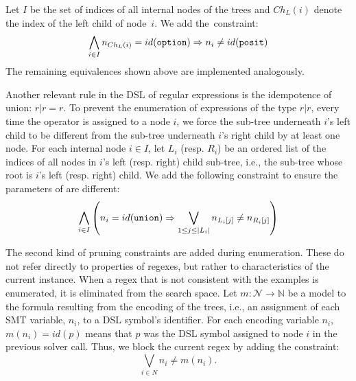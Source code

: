 Let \(I\) be the set of indices of all internal nodes of the trees and \(Ch_L(i)\) denote the index of the left child of node~\(i\). We add the~constraint:
\begin{equation}
     \bigwedge_{i \in I} n_{Ch_L(i)} = id(\texttt{option}{}) \Rightarrow n_i \ne id(\texttt{posit}{})
\end{equation}
The remaining equivalences shown above are implemented analogously.

Another relevant rule in the DSL of regular expressions is the idempotence of union: \(r|r = r\).
To prevent the enumeration of expressions of the type \(r|r\), every time the \Union{} operator is assigned to a node \(i\), %
we force the sub-tree underneath \(i\)'s left child to be different from the sub-tree underneath \(i\)'s right child by at least one node.
For each internal node \(i \in I\), let \(L_i\) (resp. \(R_i\)) be an ordered list of the indices of all nodes in \(i\)'s left (resp. right) child sub-tree, i.e., the sub-tree whose root is \(i\)'s left (resp. right) child. %
We add the following constraint to ensure the parameters of \Union{} are different:
\begin{equation}
  \bigwedge_{i \in I} \left( n_i = id(\texttt{union}{}) \Rightarrow \bigvee_{1 \le j \le |L_i|} n_{L_i[j]} \ne n_{R_i[j]} \right)
\end{equation}

The second kind of pruning constraints are added during enumeration. These do not refer directly to properties of regexes, but rather to characteristics of the current instance. When a regex that is not consistent with the examples is enumerated, it is eliminated from the search space. 
Let \(m: \mathcal{N} \to \mathbb{N}\) be a model to the formula resulting from the encoding of the trees, i.e., an assignment of each \ac{SMT} variable, \(n_i\), to a DSL symbol's identifier. For each encoding variable \(n_i\), \(m(n_i) = id(p)\) means that $p$ was the DSL symbol assigned to node $i$ in the previous solver call.
%
Thus, %
we block the current regex by adding the constraint:
\begin{equation}
  \bigvee_{i \in N} n_i \ne m(n_i).
\end{equation}

